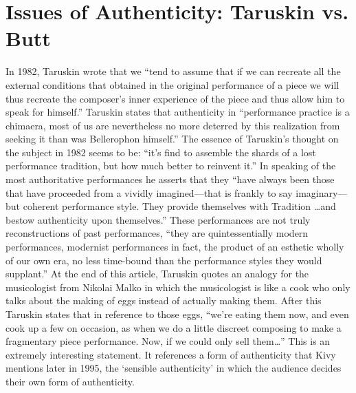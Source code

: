 \documentclass[12pt]{article}
\begin{document}
\section{Issues of Authenticity: Taruskin vs. Butt}
\label{sec:auth-vs.-inform}

In 1982, Taruskin wrote that we ``tend to assume that if we can
recreate all the external conditions that obtained in the original
performance of a piece we will thus recreate the composer's inner
experience of the piece and thus allow him to speak for
himself.''\autocite[341]{taruskin1982} Taruskin states that
authenticity in ``performance practice is a chimaera, most of us are
nevertheless no more deterred by this realization from seeking it than
was Bellerophon himself.''\autocite[341]{taruskin1982} The essence of
Taruskin's thought on the subject in 1982 seems to be: ``it's find to
assemble the shards of a lost performance tradition, but how much
better to reinvent it.''\autocite[343]{taruskin1982} In speaking of
the most authoritative performances he asserts that they ``have always
been those that have proceeded from a vividly imagined---that is
frankly to say imaginary---but coherent performance style. They
provide themselves with Tradition \ldots and bestow authenticity upon
themselves.''\autocite[343]{taruskin1982} These performances are not
truly reconstructions of past performances, ``they are
quintessentially modern performances, modernist performances in fact,
the product of an esthetic wholly of our own era, no less time-bound
than the performance styles they would
supplant.''\autocite[344]{taruskin1982} At the end of this article,
Taruskin quotes an analogy for the musicologist from Nikolai Malko in
which the musicologist is like a cook who only talks about the making
of eggs instead of actually making them. After this Taruskin states
that in reference to those eggs, ``we're eating them now, and even
cook up a few on occasion, as when we do a little discreet composing
to make a fragmentary piece performance. Now, if we could only sell
them\ldots''\autocite[349]{taruskin1982} This is an extremely
interesting statement. It references a form of authenticity that Kivy
mentions later in 1995, the `sensible authenticity' in which the
audience decides their own form of authenticity.\autocite{kivy1995}
\end{document}
